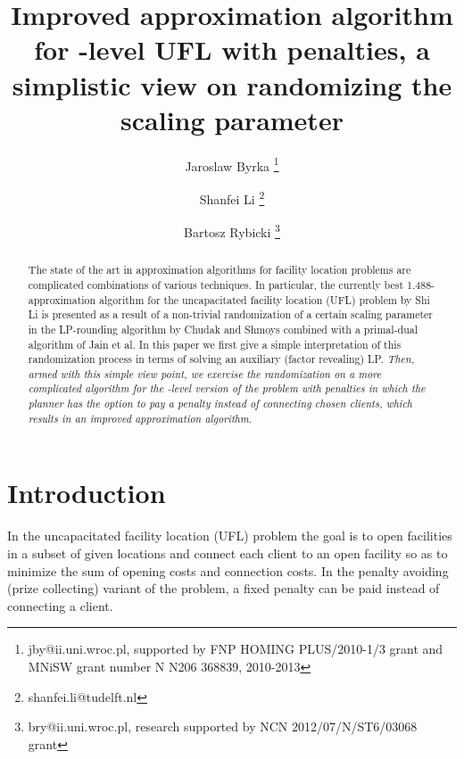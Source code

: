 \documentclass{llncs}
\newcommand{\va}[1]{{\color{black}\sl  #1}}
\begin{document}
\title{Improved approximation algorithm for -level UFL with penalties, a simplistic view on randomizing the scaling parameter}

\author{Jaroslaw Byrka \thanks{jby@ii.uni.wroc.pl, supported by FNP HOMING PLUS/2010-1/3 grant and MNiSW grant number N N206 368839, 2010-2013 } \and Shanfei Li \thanks{shanfei.li@tudelft.nl}\and Bartosz Rybicki \thanks{bry@ii.uni.wroc.pl, research supported by NCN 2012/07/N/ST6/03068 grant}}


\maketitle

\begin{abstract}
  The state of the art in approximation algorithms for facility location problems are complicated combinations of various techniques.
  In particular, the currently best 1.488-approximation algorithm for the uncapacitated facility location (UFL) problem by Shi Li is presented as a result of a non-trivial randomization of a certain scaling parameter
  in the LP-rounding algorithm by Chudak and Shmoys combined with a primal-dual algorithm of Jain et al.
  In this paper we first give a simple interpretation of this randomization process in terms of solving an auxiliary (factor revealing) LP.
  \va{Then, armed with this simple view point, we exercise the randomization on a more complicated algorithm for the -level version of the problem with penalties in which the planner has the option to pay a penalty instead of connecting chosen clients, which results in an improved approximation algorithm.}
\end{abstract}

\section{Introduction}

In the uncapacitated facility location (UFL) problem the goal is to open facilities in a subset of given locations and connect each client to an open facility so as to minimize the sum of opening costs and connection costs. In the penalty avoiding (prize collecting) variant of the problem, a fixed penalty can be paid instead of connecting a client.
\end{document}
